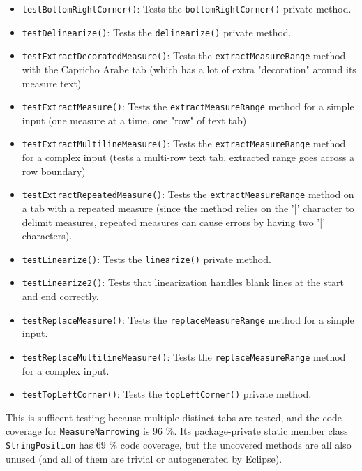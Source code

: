 \documentclass[11pt]{article}
\begin{document}
\begin{itemize}
\item \texttt{testBottomRightCorner()}: Tests the \texttt{bottomRightCorner()} private method.
\item \texttt{testDelinearize()}: Tests the \texttt{delinearize()} private method.
\item \texttt{testExtractDecoratedMeasure()}: Tests the \texttt{extractMeasureRange} method with the Capricho Arabe tab (which has a lot of extra "decoration" around its measure text)
\item \texttt{testExtractMeasure()}: Tests the \texttt{extractMeasureRange} method for a simple input (one measure at a time, one "row" of text tab)
\item \texttt{testExtractMultilineMeasure()}: Tests the \texttt{extractMeasureRange} method for a complex input (tests a multi-row text tab, extracted range goes across a row boundary)
\item \texttt{testExtractRepeatedMeasure()}: Tests the \texttt{extractMeasureRange} method on a tab with a repeated measure (since the method relies on the '|' character to delimit measures, repeated measures can cause errors by having two '|' characters).
\item \texttt{testLinearize()}: Tests the \texttt{linearize()} private method.
\item \texttt{testLinearize2()}: Tests that linearization handles blank lines at the start and end correctly.
\item \texttt{testReplaceMeasure()}: Tests the \texttt{replaceMeasureRange} method for a simple input.
\item \texttt{testReplaceMultilineMeasure()}: Tests the \texttt{replaceMeasureRange} method for a complex input.
\item \texttt{testTopLeftCorner()}: Tests the \texttt{topLeftCorner()} private method.
\end{itemize}

This is sufficent testing because multiple distinct tabs are tested, and the code coverage for \texttt{MeasureNarrowing} is 96 \%.  Its package-private static member class \texttt{StringPosition} has 69 \% code coverage, but the uncovered methods are all also unused (and all of them are trivial or autogenerated by Eclipse).
\end{document}
